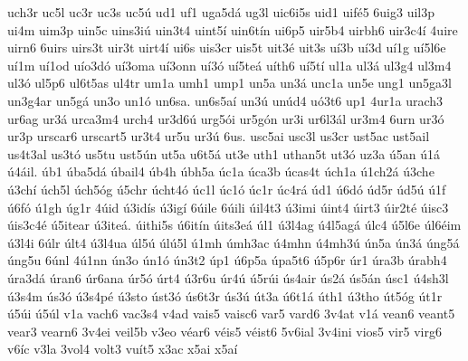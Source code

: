 {uch3r
uc5l
uc3r
uc3s
uc5ú
ud1
uf1
uga5dá
ug3l
uic6i5s
uid1
uifé5
6uig3
uil3p
ui4m
uim3p
uin5c
uins3iú
uin3t4
uint5í
uin6tín
ui6p5
uir5b4
uirbh6
uir3c4í
4uire
uirn6
6uirs
uirs3t
uir3t
uirt4í
ui6s
uis3cr
uis5t
uit3é
uit3s
uí3b
uí3d
uí1g
uí5l6e
uí1m
uí1od
uío3dó
uí3oma
uí3onn
uí3ó
uí5teá
uíth6
uí5tí
ul1a
ul3á
ul3g4
ul3m4
ul3ó
ul5p6
ul6t5as
ul4tr
um1a
umh1
ump1
un5a
un3á
unc1a
un5e
ung1
un5ga3l
un3g4ar
un5gá
un3o
un1ó
un6sa.
un6s5aí
un3ú
unúd4
uó3t6
up1
4ur1a
urach3
ur6ag
ur3á
urca3m4
urch4
ur3d6ú
urg5ói
ur5gón
ur3i
ur6l3ál
ur3m4
6urn
ur3ó
ur3p
urscar6
urscart5
ur3t4
ur5u
ur3ú
6us.
usc5ai
usc3l
us3cr
ust5ac
ust5ail
us4t3al
us3tó
us5tu
ust5ún
ut5a
u6t5á
ut3e
uth1
uthan5t
ut3ó
uz3a
ú5an
ú1á
ú4áil.
úb1
úba5dá
úbail4
úb4h
úbh5a
úc1a
úca3b
úcas4t
úch1a
ú1ch2á
ú3che
ú3chí
úch5l
úch5óg
ú5chr
úcht4ó
úc1l
úc1ó
úc1r
úc4rá
úd1
ú6dó
úd5r
úd5ú
ú1f
ú6fó
ú1gh
úg1r
4úid
ú3idís
ú3igí
6úile
6úili
úil4t3
ú3imi
úint4
úirt3
úir2té
úisc3
úis3c4é
ú5itear
ú3iteá.
úithi5s
ú6itín
úits3eá
úl1
ú3l4ag
ú4l5agá
úlc4
ú5l6e
úl6éim
ú3l4i
6úlr
últ4
ú3l4ua
úl5ú
úlú5l
ú1mh
úmh3ac
ú4mhn
ú4mh3ú
ún5a
ún3á
úng5á
úng5u
6únl
4ú1nn
ún3o
ún1ó
ún3t2
úp1
ú6p5a
úpa5t6
ú5p6r
úr1
úra3b
úrabh4
úra3dá
úran6
úr6ana
úr5ó
úrt4
ú3r6u
úr4ú
ú5rúi
ús4air
ús2á
ús5án
úsc1
ú4sh3l
ú3s4m
ús3ó
ú3s4pé
ú3sto
úst3ó
ús6t3r
ús3ú
út3a
ú6t1á
úth1
ú3tho
út5óg
út1r
ú5úi
ú5úl
v1a
vach6
vac3s4
v4ad
vais5
vaisc6
var5
vard6
3v4at
v1á
vean6
veant5
vear3
vearn6
3v4ei
veil5b
v3eo
véar6
véis5
véist6
5v6ial
3v4ini
vios5
vir5
virg6
v6íc
v3la
3vol4
volt3
vuít5
x3ac
x5ai
x5aí
}

